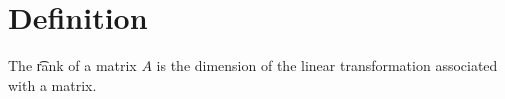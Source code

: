 
\section*{Definition}

The \t{rank} of a matrix $A$ is the dimension of the linear transformation associated with a matrix.

\blankpage